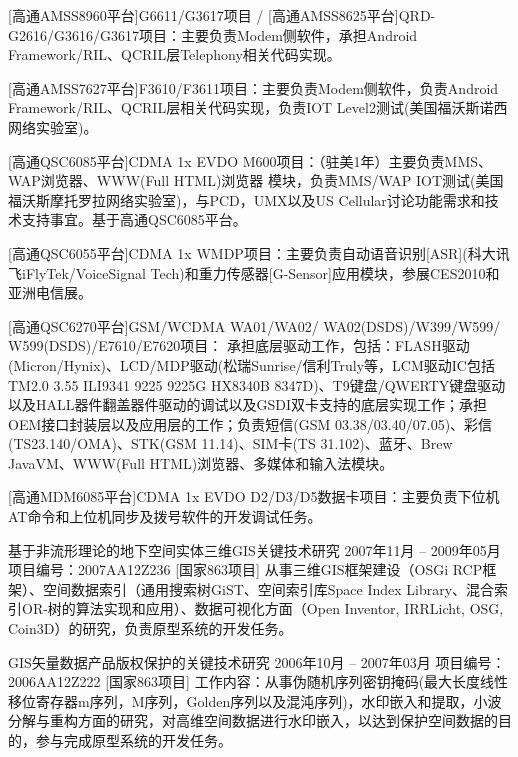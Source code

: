 \documentclass{resume}
\begin{document}
[高通AMSS8960平台]G6611/G3617项目 / [高通AMSS8625平台]QRD-G2616/G3616/G3617项目：主要负责Modem侧软件，承担Android Framework/RIL、QCRIL层Telephony相关代码实现。

[高通AMSS7627平台]F3610/F3611项目：主要负责Modem侧软件，负责Android Framework/RIL、QCRIL层相关代码实现，负责IOT Level2测试(美国福沃斯诺西网络实验室)。

[高通QSC6085平台]CDMA 1x EVDO M600项目：（驻美1年）主要负责MMS、WAP浏览器、WWW(Full HTML)浏览器 模块，负责MMS/WAP IOT测试(美国福沃斯摩托罗拉网络实验室)，与PCD，UMX以及US Cellular讨论功能需求和技术支持事宜。基于高通QSC6085平台。

[高通QSC6055平台]CDMA 1x WMDP项目：主要负责自动语音识别[ASR](科大讯飞iFlyTek/VoiceSignal Tech)和重力传感器[G-Sensor]应用模块，参展CES2010和亚洲电信展。

[高通QSC6270平台]GSM/WCDMA WA01/WA02/ WA02(DSDS)/W399/W599/ W599(DSDS)/E7610/E7620项目：
承担底层驱动工作，包括：FLASH驱动(Micron/Hynix)、LCD/MDP驱动(松瑞Sunrise/信利Truly等，LCM驱动IC包括TM2.0 3.55 ILI9341 9225 9225G HX8340B 8347D)、T9键盘/QWERTY键盘驱动以及HALL器件翻盖器件驱动的调试以及GSDI双卡支持的底层实现工作；承担OEM接口封装层以及应用层的工作；负责短信(GSM 03.38/03.40/07.05)、彩信(TS23.140/OMA)、STK(GSM 11.14)、SIM卡(TS 31.102)、蓝牙、Brew JavaVM、WWW(Full HTML)浏览器、多媒体和输入法模块。

[高通MDM6085平台]CDMA 1x EVDO D2/D3/D5数据卡项目：主要负责下位机AT命令和上位机同步及拨号软件的开发调试任务。
\spaceline{}

基于非流形理论的地下空间实体三维GIS关键技术研究 		2007年11月 – 2009年05月
项目编号：2007AA12Z236 [国家863项目]
从事三维GIS框架建设（OSGi RCP框架）、空间数据索引（通用搜索树GiST、空间索引库Space Index Library、混合索引OR-树的算法实现和应用）、数据可视化方面（Open Inventor, IRRLicht, OSG, Coin3D）的研究，负责原型系统的开发任务。

GIS矢量数据产品版权保护的关键技术研究				2006年10月 – 2007年03月
项目编号：2006AA12Z222 [国家863项目]
工作内容：从事伪随机序列密钥掩码(最大长度线性移位寄存器m序列，M序列，Golden序列以及混沌序列)，水印嵌入和提取，小波分解与重构方面的研究，对高维空间数据进行水印嵌入，以达到保护空间数据的目的，参与完成原型系统的开发任务。
\spaceline{}
\end{document}
